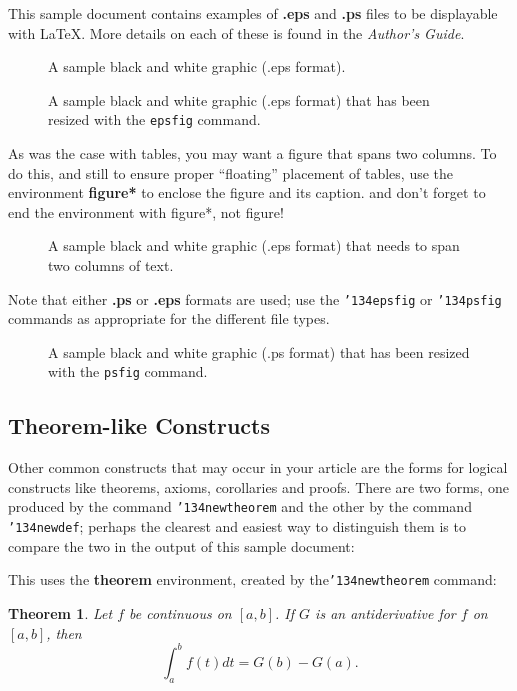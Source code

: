 \documentclass{sig-alternate}
\begin{document}
{This sample document contains examples of \textbf{.eps}
and \textbf{.ps} files to be displayable with \LaTeX.  More
details on each of these is found in the \textit{Author's Guide}.

\begin{figure}
\centering
{}
\caption{A sample black and white graphic (.eps format).}
\end{figure}

\begin{figure}
\centering
{}
\caption{A sample black and white graphic (.eps format)
that has been resized with the \texttt{epsfig} command.}
\end{figure}


As was the case with tables, you may want a figure
that spans two columns.  To do this, and still to
ensure proper ``floating'' placement of tables, use the environment
\textbf{figure*} to enclose the figure and its caption.
and don't forget to end the environment with
{figure*}, not {figure}!

\begin{figure*}
\centering
{}
\caption{A sample black and white graphic (.eps format)
that needs to span two columns of text.}
\end{figure*}

Note that either {\textbf{.ps}} or {\textbf{.eps}} formats are
used; use
the \texttt{{\char'134}epsfig} or \texttt{{\char'134}psfig}
commands as appropriate for the different file types.

\begin{figure}
\centering
{}
\caption{A sample black and white graphic (.ps format) that has
been resized with the \texttt{psfig} command.}
\vskip -6pt
\end{figure}

\subsection{Theorem-like Constructs}
Other common constructs that may occur in your article are
the forms for logical constructs like theorems, axioms,
corollaries and proofs.  There are
two forms, one produced by the
command \texttt{{\char'134}newtheorem} and the
other by the command \texttt{{\char'134}newdef}; perhaps
the clearest and easiest way to distinguish them is
to compare the two in the output of this sample document:

This uses the \textbf{theorem} environment, created by
the\linebreak\texttt{{\char'134}newtheorem} command:
\newtheorem{theorem}{Theorem}
\begin{theorem}
Let $f$ be continuous on $[a,b]$.  If $G$ is
an antiderivative for $f$ on $[a,b]$, then
\begin{displaymath}\int^b_af(t)dt = G(b) - G(a).\end{displaymath}
\end{theorem}

}
\end{document}
